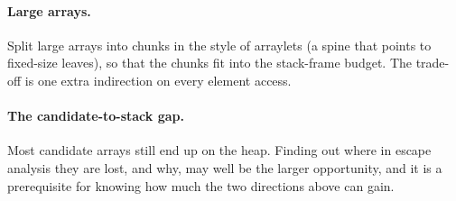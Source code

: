 \paragraph{Large arrays.} Split large arrays into chunks in the style of arraylets (a spine that
points to fixed-size leaves), so that the chunks fit into the stack-frame budget. The trade-off is
one extra indirection on every element access.

\paragraph{The candidate-to-stack gap.} Most candidate arrays still end up on the heap. Finding
out where in escape analysis they are lost, and why, may well be the larger opportunity, and it
is a prerequisite for knowing how much the two directions above can gain.
